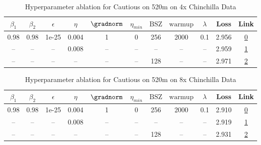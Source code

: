 \begin{table}[H]
\centering
\caption{Hyperparameter ablation for Cautious on 520m on 4x Chinchilla Data}
\label{tab:ablation_cautious_520m_on_4x_chinchilla_data}
\begin{tabular}{ccccccccccc}
\toprule
$\beta_1$ & $\beta_2$ & $\epsilon$ & $\eta$ & $\gradnorm$ & $\eta_{min}$ & $\mathrm{BSZ}$ & $\mathrm{warmup}$ & $\lambda$ & Loss & Link \\
\midrule
0.98 & 0.98 & 1e-25 & 0.004 & 1 & 0 & 256 & 2000 & 0.1 & 2.956 & \href{https://wandb.ai/stanford-mercury/optimizer-scaling/runs/sweep-520m-42B-cautious553798lr0.004-wd0.1-minlr0-warmup2000-b10-e08bbe}{0} \\
\midrule
-- & -- & -- & 0.008 & -- & -- & -- & -- & -- & 2.959 & \href{https://wandb.ai/stanford-mercury/optimizer-scaling/runs/sweep-520m-42B-cautiousd91085lr0.008-wd0.1-minlr0-warmup2000-b10-50463b}{1} \\
-- & -- & -- & -- & -- & -- & 128 & -- & -- & 2.971 & \href{https://wandb.ai/stanford-mercury/optimizer-scaling/runs/sweep-520m-42B-cautious6977a2lr0.004-wd0.1-minlr0-warmup2000-b10-27d459}{2} \\
\bottomrule
\end{tabular}
\end{table}

\begin{table}[H]
\centering
\caption{Hyperparameter ablation for Cautious on 520m on 8x Chinchilla Data}
\label{tab:ablation_cautious_520m_on_8x_chinchilla_data}
\begin{tabular}{ccccccccccc}
\toprule
$\beta_1$ & $\beta_2$ & $\epsilon$ & $\eta$ & $\gradnorm$ & $\eta_{min}$ & $\mathrm{BSZ}$ & $\mathrm{warmup}$ & $\lambda$ & Loss & Link \\
\midrule
0.98 & 0.98 & 1e-25 & 0.004 & 1 & 0 & 256 & 2000 & 0.1 & 2.910 & \href{https://wandb.ai/stanford-mercury/optimizer-scaling/runs/sweep-520m-85B-cautious66b1b7lr0.004-wd0.1-minlr0-warmup2000-b10-d99a40}{0} \\
\midrule
-- & -- & -- & 0.008 & -- & -- & -- & -- & -- & 2.919 & \href{https://wandb.ai/stanford-mercury/optimizer-scaling/runs/sweep-520m-85B-cautious33285clr0.008-wd0.1-minlr0-warmup2000-b10-260c3f}{1} \\
-- & -- & -- & -- & -- & -- & 128 & -- & -- & 2.931 & \href{https://wandb.ai/stanford-mercury/optimizer-scaling/runs/sweep-520m-85B-cautious8ee009lr0.004-wd0.1-minlr0-warmup2000-b10-2ee0a2}{2} \\
\bottomrule
\end{tabular}
\end{table}

